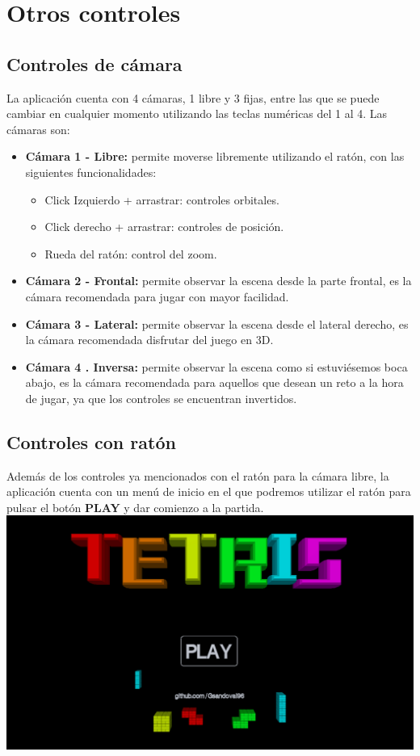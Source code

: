 \documentclass[11pt,a4paper]{article}
\begin{document}
\newpage

\section{Otros controles}
\subsection{Controles de cámara}

La aplicación cuenta con 4 cámaras, 1 libre y 3 fijas, entre las que se puede cambiar en cualquier momento utilizando las teclas numéricas del 1 al 4. Las cámaras son:

\begin{itemize}
    \item \textbf{Cámara 1 - Libre:} permite moverse libremente utilizando el ratón, con las siguientes funcionalidades:
    \begin{itemize}
        \item Click Izquierdo + arrastrar: controles orbitales.
        \item Click derecho + arrastrar: controles de posición.
        \item Rueda del ratón: control del zoom.
    \end{itemize}
    \item \textbf{Cámara 2 - Frontal:} permite observar la escena desde la parte frontal, es la cámara recomendada para jugar con mayor facilidad.
    \item \textbf{Cámara 3 - Lateral:} permite observar la escena desde el lateral derecho, es la cámara recomendada disfrutar del juego en 3D.
    \item \textbf{Cámara 4 . Inversa:} permite observar la escena como si estuviésemos boca abajo, es la cámara recomendada para aquellos que desean un reto a la hora de jugar, ya que los controles se encuentran invertidos.
\end{itemize}

\subsection{Controles con ratón}

Además de los controles ya mencionados con el ratón para la cámara libre, la aplicación cuenta con un menú de inicio en el que podremos utilizar el ratón para pulsar el botón \textbf{PLAY} y dar comienzo a la partida.\\

\includegraphics[scale=0.25]{menu.jpg}
\end{document}
